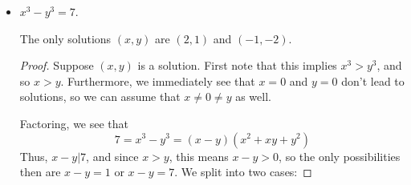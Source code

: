 \documentclass[11pt,dvipsnames]{book}
\numberwithin{equation}{section} %
\numberwithin{figure}{section} %
\numberwithin{table}{section} %
\begin{document}
\begin{exercise}
\begin{itemize}
\begin{solution}
\begin{proof}
 

\begin{claim}
For any integers $m,n$, $m^3-n^3\neq 4$.
\end{claim}

\begin{proof}
Suppose for the sake of contradiction that $m^3-n^3=1$ for some integers $m$ and $n$. Note that $m>n$, since if $n\geq m$, then $n^3\geq m^3=n^3+1$, which is a contradiction. Then 
\[
4=m^3-n^3= (m-n)(m^2+mn+n^2)
\]
hence $m-n|4$, so $m-n=\pm 1,\pm 2,$ or $\pm 4$. Since $m>n$, this means $m-n= 1,2,$ or $4$. Suppose first that $m-n=1$. Then
\[
4=m^3-n^3=(n+1)^3-n^2 = 3n^2+3n+1.
\]
This implies $3=3n^2+3n=3n(n+1)$, so $n(n+1)=1$, which is impossible. 

If $m-n=2$, then 
\[
4=m^3-n^3=(n+2)^3-n^2 = 6n^2+12n+8.
\]
Then this implies $-4=6n^2+12n$, but this is impossible since $4$ is not divisible by 3. 

Finally, if $m-n=4$, then 
\[
4=m^3-n^3=(n+4)^3-n^2 = 12n^2+48n+64.
\]
so $-60=12n^2+48n=12n(n+4)$, so $-5 = n(n+4)$. For this to be possible, either $n=\pm 1$ or $\pm 5$, but by checking all 4 values, we see that this equation cannot be satisfied,. 
\end{proof}
\end{proof}
\end{solution}

\item $x^3-y^3=7$. 


\begin{solution}

\begin{claim}
The only solutions $(x,y)$ are $(2,1)$ and $(-1,-2)$. 
\end{claim}

\begin{proof}
Suppose $(x,y)$ is a solution. First note that this implies $x^3>y^3$, and so $x>y$. Furthermore, we immediately see that $x=0$ and $y=0$ don't lead to solutions, so we can assume that $x\neq 0 \neq y$ as well. 

Factoring, we see that 
\[
7 = x^3-y^3= (x-y)(x^2+xy+y^2)
\]
Thus, $x-y| 7$, and since $x>y$, this means $x-y>0$, so the only possibilities then are $x-y=1$ or $x-y=7$. We split into two cases:


\end{proof}
\end{solution}
\end{itemize}
\end{exercise}
\end{document}
